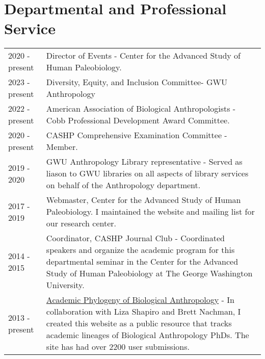 \documentclass{article}
\begin{document}
 
\section*{Departmental and Professional Service}
\begin{longtable}{p{}p{}}
2020 - present & Director of Events - Center for the Advanced Study of Human Paleobiology.\\[4pt]
2023 - present & Diversity, Equity, and Inclusion Committee- GWU Anthropology\\[4pt]
2022 - present  & American Association of Biological Anthropologists - Cobb Professional Development Award Committee.\\[4pt]
2020 - present & CASHP Comprehensive Examination Committee - Member.\\[4pt]
2019 - 2020 & GWU Anthropology Library representative - Served as liason to GWU libraries on all aspects of library services on behalf of the Anthropology department.\\[4pt]
2017 - 2019 & Webmaster, Center for the Advanced Study of Human Paleobiology. I maintained the website and mailing list for our research center.\\[4pt]
2014 - 2015 & Coordinator, CASHP Journal Club - Coordinated speakers and organize the academic program for this departmental seminar in the Center for the Advanced Study of Human Paleobiology at The George Washington University. \\[4pt]
2013 - present &  \href{https://bioanthtree.org}{Academic Phylogeny of Biological Anthropology} - In collaboration with Liza Shapiro and Brett Nachman, I created this website as a public resource that tracks academic lineages of Biological Anthropology PhDs. The site has had over 2200 user submissions.\\
\end{longtable}
\end{document}
